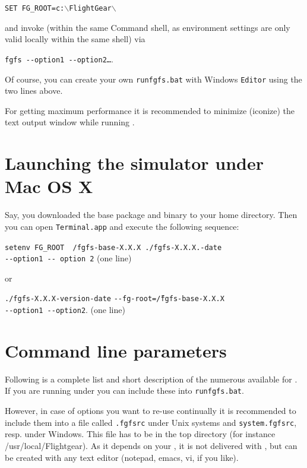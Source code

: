 \texttt{SET FG\_ROOT=c:$\backslash$FlightGear$\backslash$}
 \medskip

\noindent
 and invoke \FlightGear{} (within the same Command shell, as environment
 settings are only valid locally within the same shell) via
  \medskip

\texttt{fgfs -$ $-option1 -$ $-option2\dots}.
 \medskip

Of course,  you can create your own \texttt{runfgfs.bat} with Windows \texttt{Editor} using the
two lines above.

For getting maximum performance it is recommended to minimize (iconize) the text output
window while running \FlightGear{}$\!$.

\section{Launching the simulator under Mac OS X}
Say, you downloaded the base package and binary to your home directory. Then you can open \texttt{Terminal.app} and execute the following sequence:
\medskip

\noindent
\texttt{setenv FG\_ROOT ~/fgfs-base-X.X.X ./fgfs-X.X.X.-date}\\
\texttt{-$ $-option1 -$ $- option 2} (one line)
\medskip

\noindent
or
\medskip

\noindent
\texttt{./fgfs-X.X.X-version-date}
 \texttt{-$ $-fg-root=\~/fgfs-base-X.X.X}\\
 \texttt{-$ $-option1 -$ $-option2}. (one line)

\section{Command line parameters\label{options}}
Following is a complete list and short description of the numerous 
available for \FlightGear{}$\!$. If you are running \FlightGear{} under  you can include these into
\texttt{runfgfs.bat}.

However, in case of options you want to re-use continually it is recommended to include them into a file called
\texttt{.fgfsrc} under Unix systems and
\texttt{system.fgfsrc}, resp. under Windows. This file has to be in
the top \FlightGear{} directory (for instance /usr/local/Flightgear). As it depends on your
, it is not delivered with \FlightGear{}$\!$, but can be created with
any text editor (notepad, emacs, vi, if you like). 

